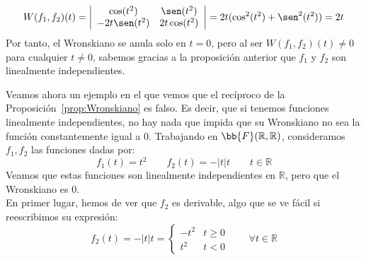 \begin{ejemplo}
\begin{itemize}
            \begin{equation*}
                W(f_1,f_2)(t) = \left|\begin{array}{cc}
                    \cos(t^2) & \sen(t^2) \\
                    -2t\sen(t^2) & 2t\cos(t^2) 
                \end{array}\right| = 2t (\cos^2(t^2) + \sen^2(t^2))= 2t
            \end{equation*}
            Por tanto, el Wronskiano se anula solo en $t=0$, pero al ser $W(f_1,f_2)(t) \neq 0$ para cualquier $t\neq 0$, sabemos gracias a la proposición anterior que $f_1$ y $f_2$ son linealmente independientes.
    \end{itemize}
\end{ejemplo}

\begin{ejemplo}
    Veamos ahora un ejemplo en el que vemos que el recíproco de la Proposición~\ref{prop:Wronskiano} es falso. Es decir, que si tenemos funciones linealmente independientes, no hay nada que impida que su Wronskiano no sea la función constantemente igual a 0. Trabajando en $\bb{F}(\mathbb{R},\mathbb{R})$, consideramos $f_1,f_2$ las funciones dadas por:
    \begin{equation*}
        f_1(t) = t^2 \qquad f_2(t) = -|t|t \qquad t\in \mathbb{R}
    \end{equation*}
    Veamos que estas funciones son linealmente independientes en $\mathbb{R}$, pero que el Wronskiano es 0.\\

    En primer lugar, hemos de ver que $f_2$ es derivable, algo que se ve fácil si reescribimos su expresión:
    \begin{equation*}
        f_2(t) = -|t|t = \left\{\begin{array}{rr}
                -t^2 & t \geq 0 \\
                t^2 & t<0
        \end{array}\right. \qquad \forall t\in \mathbb{R}
    \end{equation*}


\end{ejemplo}
